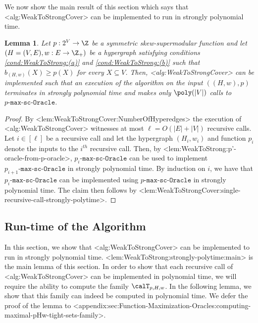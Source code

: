 \documentclass{article}
\def\Cref#1{<#1>}%
\newtheorem{lemma}{Lemma}[section]
\newcommand{\functionMaximizationOracleStrongCover}[1]{\ensuremath{{#1}\text{-}\mathtt{max}\text{-}\mathtt{sc}\text{-}\mathtt{Oracle}}\xspace}
\newcommand{\maximalTightSetFamily}[1]{\ensuremath{\calT_{#1}}\xspace}
\newcommand{\maximalTightSetContainingHyperedge}[1]{\ensuremath{\tau_{#1}}\xspace}
\begin{document}
    We now show the main result of this section which says that \Cref{alg:WeakToStrongCover} can be implemented to run in strongly polynomial time.

\begin{lemma}\label{lem:WeakToStrongCover:strongly-polynomial-runtime:main}
    Let $p:2^V\rightarrow\Z$ be a symmetric skew-supermodular function and let $\left(H = (V, E), w:E \rightarrow\Z_+\right)$ be a hypergraph satisfying conditions \ref{cond:WeakToStrong:(a)} and \ref{cond:WeakToStrong:(b)} such that $b_{(H,w)}(X) \geq p(X)$ for every $X \subseteq V$. Then, \Cref{alg:WeakToStrongCover} can be implemented such that an execution of the algorithm on the input $((H,w), p)$ terminates in strongly polynomial time and makes only $\poly(|V|)$ calls to \functionMaximizationOracleStrongCover{p}.
\end{lemma}
\begin{proof}
 By \Cref{lem:WeakToStrongCover:NumberOfHyperedges} the execution of \Cref{alg:WeakToStrongCover} witnesses at most $\ell = O(|E| + |V|)$ recursive calls. Let $i \in [\ell]$ be a recursive call and let the hypergraph $(H_{i}, w_i)$ and function $p_i$ denote the inputs to the $i^{th}$ recursive call. Then, by \Cref{lem:WeakToStrong:p'-oracle-from-p-oracle}, \functionMaximizationOracleStrongCover{p_i} can be used to implement \functionMaximizationOracleStrongCover{p_{i+1}} in strongly polynomial time. By induction on $i$, we have that \functionMaximizationOracleStrongCover{p_i} can be implemented using \functionMaximizationOracleStrongCover{p} in strongly polynomial time. The claim then follows by \Cref{lem:WeakToStrongCover:single-recursive-call-strongly-polytime}.
\end{proof}
\fi


\subsection{Run-time of the Algorithm}
\label{sec:WeakToStrongCover:strongly-poly-runtime:main}
In this section, we show that \Cref{alg:WeakToStrongCover} can be implemented to run in strongly polynomial time. 
\Cref{lem:WeakToStrong:strongly-polytime:main} is the main lemma of this section. 
In order to show that each recursive call of \Cref{alg:WeakToStrongCover} can be implemented in polynomial time, we will require the ability to compute the family \maximalTightSetFamily{p, H, w}.  
In the following lemma, we show that this family can indeed be computed in polynomial time. We defer the proof of the lemma to \Cref{appendix:sec:Function-Maximization-Oracles:computing-maximal-pHw-tight-sets-family}.
\end{document}
